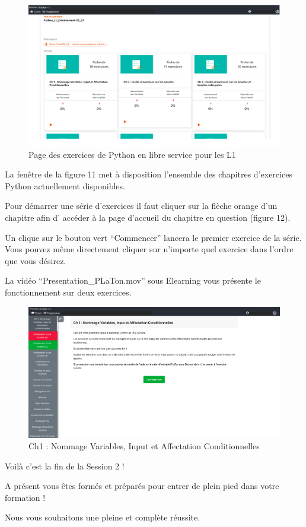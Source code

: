 \documentclass{article}
\begin{document}
\begin{figure}[h!]
    \begin{center}
    \includegraphics[scale=0.3]{PLaTon1.png}
    \caption{Page des exercices de Python en libre service pour les L1}
     \end{center}
\end{figure}   

La fenêtre de la figure 11 met à disposition l'ensemble des chapitres d'exercices Python actuellement disponibles. 

Pour démarrer une série d'exercices il faut cliquer sur la flèche orange d'un chapitre afin d' accéder à la page d'accueil du chapitre en question (figure 12). 

Un clique sur le bouton vert ``Commencer'' lancera le premier exercice de la série. Vous pouvez même directement cliquer sur n'importe quel exercice dans l'ordre que vous désirez.

La vidéo ``Presentation\_PLaTon.mov'' sous Elearning vous présente le fonctionnement sur deux exercices.

\begin{figure}[h!]
    \begin{center}
    \includegraphics[scale=0.25]{PLaTon2.png}
    \caption{Ch1 : Nommage Variables, Input et Affectation Conditionnelles}
     \end{center}
\end{figure}   

\newpage

Voilà c'est la fin de la Session 2 ! 

A présent vous êtes formés et préparés pour entrer de plein pied dans votre formation ! 

Nous vous souhaitons une pleine et complète réussite.
\end{document}
